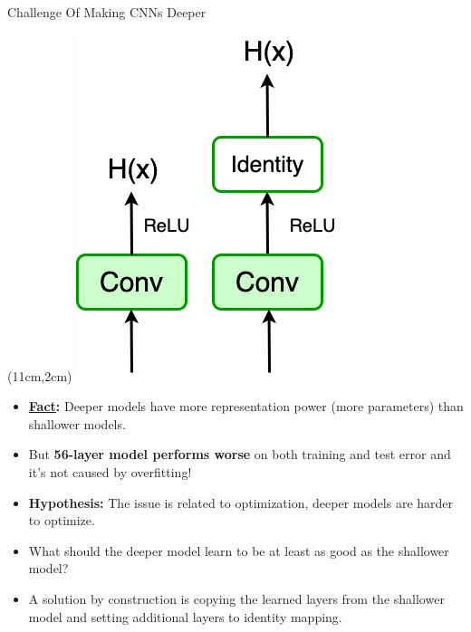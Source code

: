 \documentclass[serif, aspectratio=169]{beamer}
\begin{document}
\begin{frame}{Challenge Of Making CNNs Deeper}
	
	\begin{textblock*}{5cm}(11cm,2cm) %
		\includegraphics[keepaspectratio, scale=0.4]{pic/Identity}
	\end{textblock*}
	
	\begin{itemize}
		\item \textbf{\underline{Fact}:} Deeper models have more representation \newline power (more parameters) than shallower models.
		\item But \textbf{56-layer model performs worse} on both training \newline and test error and it’s not caused by overfitting!
		\item \textbf{Hypothesis:} The issue is related to optimization, \newline deeper models are harder to optimize.
		\item \color{red} What should the deeper model learn to be at least \newline as good as the shallower model?
		\item A solution by construction is copying the learned \newline layers from the shallower model and setting additional \newline layers to identity mapping.
	\end{itemize}
\end{frame}
\end{document}
